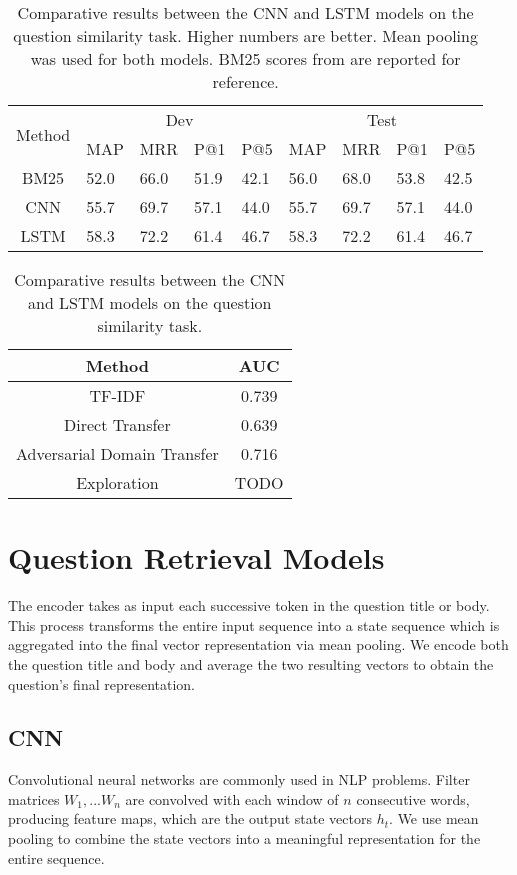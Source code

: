 \documentclass[11pt,a4paper]{article}
\begin{document}
\begin{table*}[!ht]
\centering
\begin{tabular}{c|p{1cm}|p{1cm}|p{1cm}|p{1cm}|p{1cm}|p{1cm}|p{1cm}|p{1cm}}
\hline
\multirow{2}{*}{Method} & \multicolumn{4}{c}{Dev} \vline & \multicolumn{4}{c}{Test} \\  
\cline{2-9} 
& MAP & MRR & P@1 & P@5 & MAP & MRR & P@1 & P@5\\ \hline
BM25 \cite{lei} & 52.0 & 66.0 & 51.9 & 42.1 & 56.0 & 68.0 & 53.8 & 42.5 \\
CNN & 55.7 & 69.7 & 57.1 & 44.0 & 55.7 & 69.7 & 57.1 & 44.0 \\
LSTM & 58.3 & 72.2 & 61.4 & 46.7 & 58.3 & 72.2 & 61.4 & 46.7\\
\hline
\end{tabular}
\caption{Comparative results between the CNN and LSTM models on the question similarity task. Higher numbers are better. Mean pooling was used for both models. BM25 scores from \cite{lei} are reported for reference.}
\label{table2}
\end{table*}

\begin{table}
\centering
\begin{tabular}{cc}
\hline
Method & AUC \\
\hline
TF-IDF & 0.739 \\
Direct Transfer & 0.639 \\
Adversarial Domain Transfer & 0.716 \\
Exploration & TODO \\
\hline
\end{tabular}
\caption{Comparative results between the CNN and LSTM models on the question similarity task. }
\label{table3}
\end{table}

\section{Question Retrieval Models}
The encoder takes as input each successive token in the question title or body. This process transforms the entire input sequence into a state sequence which is aggregated into the final vector representation via mean pooling. We encode both the question title and body and average the two resulting vectors to obtain the question’s final representation.

\subsection*{CNN}
Convolutional neural networks \cite{lecun} are commonly used in NLP problems. Filter matrices $W_1,...W_n$ are convolved with each window of $n$ consecutive words, producing feature maps, which are the output state vectors $h_t$. We use mean pooling to combine the state vectors into a meaningful representation for the entire sequence.
\end{document}
